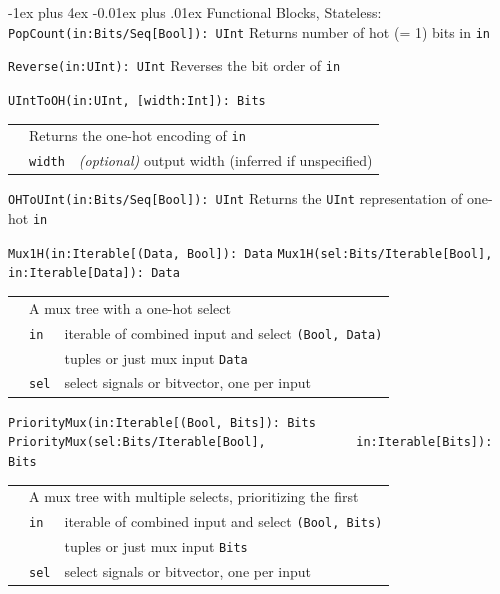 \documentclass[10pt,landscape]{article}
\makeatletter
\renewcommand{\subsection}{\@startsection{subsection}{2}{0mm}%
                                {-1ex plus 4ex}%
                                {-0.01ex plus .01ex}%
                                {\normalfont\normalsize\bfseries}}
\makeatother
\begin{document}
\begin{multicols}{3}
\subsection{Functional Blocks, Stateless}: \newline
\verb$PopCount(in:Bits/Seq[Bool]): UInt$ \newline
\phantom{x} Returns number of hot (= 1) bits in \verb$in$

\verb$Reverse(in:UInt): UInt$ \newline
\phantom{x} Reverses the bit order of \verb$in$

\verb$UIntToOH(in:UInt, [width:Int]): Bits$ \newline
\begin{tabular}{l l l}
& \multicolumn{2}{l}{Returns the one-hot encoding of \texttt{in}} \\
& \verb$width$ & {\em(optional)} output width (inferred if unspecified) \\
\end{tabular}

\verb$OHToUInt(in:Bits/Seq[Bool]): UInt$ \newline
\phantom{x} Returns the \verb$UInt$ representation of one-hot \verb$in$

\verb$Mux1H(in:Iterable[(Data, Bool]): Data$ \newline
\verb$Mux1H(sel:Bits/Iterable[Bool],$ \newline
\verb$      in:Iterable[Data]): Data$ \newline
\begin{tabular}{l l l}
& \multicolumn{2}{l}{A mux tree with a one-hot select} \\
& \verb$in$ & iterable of combined input and select \verb$(Bool, Data)$ \\
& & tuples or just mux input \verb$Data$ \\
& \verb$sel$ & select signals or bitvector, one per input \\
\end{tabular}

\verb$PriorityMux(in:Iterable[(Bool, Bits]): Bits$ \newline
\verb$PriorityMux(sel:Bits/Iterable[Bool],$ \newline
\verb$            in:Iterable[Bits]): Bits$ \newline
\begin{tabular}{l l l}
& \multicolumn{2}{l}{A mux tree with multiple selects, prioritizing the first} \\
& \verb$in$ & iterable of combined input and select \verb$(Bool, Bits)$ \\
& & tuples or just mux input \verb$Bits$ \\
& \verb$sel$ & select signals or bitvector, one per input \\
\end{tabular}


\end{multicols}
\end{document}
